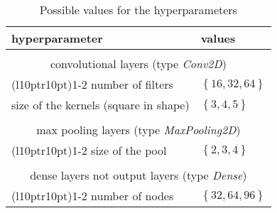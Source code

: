 \begin{table}[h]
    \centering
    \begin{tabular}{ll}
        \textbf{hyperparameter} & \textbf{values}\\
        \midrule
        \\
        \multicolumn{2}{c}{convolutional layers (type \textit{Conv2D})} \\
        \cmidrule(l{10pt}r{10pt}){1-2} 
        number of filters & $\left\{16, 32, 64\right\}$ \\
        size of the kernels (square in shape) & $\left\{3, 4, 5\right\}$\\
        \\
        \multicolumn{2}{c}{max pooling layers (type \textit{MaxPooling2D})
        } \\
        \cmidrule(l{10pt}r{10pt}){1-2} 
        size of the pool & $\left\{2, 3, 4\right\}$\\
        \\
        \multicolumn{2}{c}{dense layers not output layers (type \textit{Dense})} \\
        \cmidrule(l{10pt}r{10pt}){1-2}
        number of nodes & $\left\{32, 64, 96\right\}$
    \end{tabular}
    \caption{Possible values for the hyperparameters}
    \label{tab:hyperparameters}
\end{table}